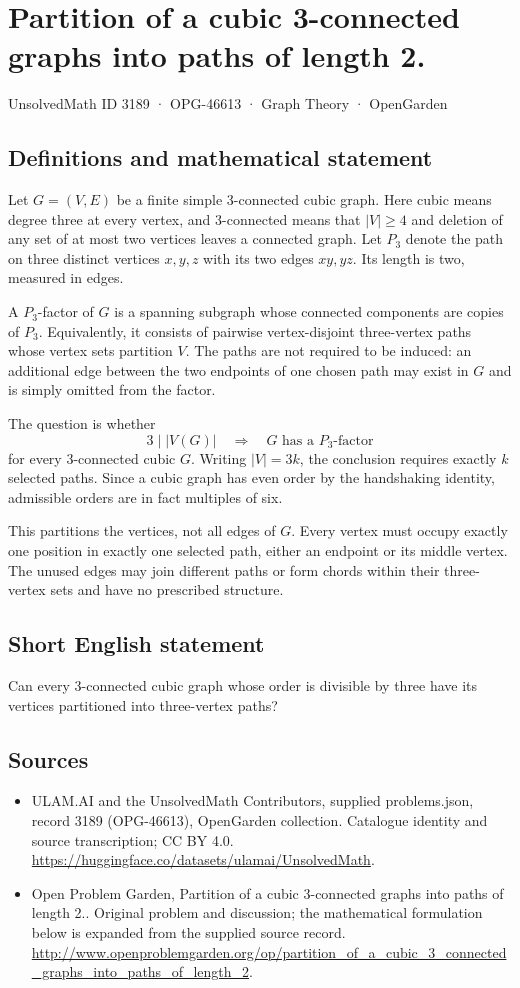 \documentclass[11pt,a4paper]{article}
\begin{document}
\section*{Partition of a cubic 3-connected graphs into paths of length 2.}\label{3189}
{\small UnsolvedMath ID 3189 · OPG-46613 · Graph Theory · OpenGarden}
\subsection{Definitions and mathematical statement}
Let $G=(V,E)$ be a finite simple $3$-connected cubic
graph. Here cubic means degree three at every vertex,
and $3$-connected means that $|V|\geq4$ and deletion
of any set of at most two vertices leaves a
connected graph. Let $P_3$ denote the path on three
distinct vertices $x,y,z$ with its two edges $xy,yz$.
Its length is two, measured in edges.

A $P_3$-factor of $G$ is a spanning subgraph whose
connected components are copies of $P_3$. Equivalently,
it consists of pairwise vertex-disjoint three-vertex
paths whose vertex sets partition $V$. The paths
are not required to be induced: an additional edge
between the two endpoints of one chosen path may
exist in $G$ and is simply omitted from the factor.

The question is whether
\[
 3\mid |V(G)|\quad\Longrightarrow\quad
 G\text{ has a }P_3\text{-factor}
\]
for every $3$-connected cubic $G$. Writing $|V|=3k$,
the conclusion requires exactly $k$ selected paths.
Since a cubic graph has even order by the
handshaking identity, admissible orders are in fact
multiples of six.

This partitions the vertices, not all edges of
$G$. Every vertex must occupy exactly one position
in exactly one selected path, either an endpoint
or its middle vertex. The unused edges may join
different paths or form chords within their
three-vertex sets and have no prescribed structure.
\subsection{Short English statement}
Can every 3-connected cubic graph whose order is divisible by three have its vertices partitioned into three-vertex paths?
\subsection{Sources}
\begin{itemize}
\item[S1] ULAM.AI and the UnsolvedMath Contributors, supplied problems.json, record 3189 (OPG-46613), OpenGarden collection. Catalogue identity and source transcription; CC BY 4.0.
\url{https://huggingface.co/datasets/ulamai/UnsolvedMath}.
\item[S2] Open Problem Garden, Partition of a cubic 3-connected graphs into paths of length 2.. Original problem and discussion; the mathematical formulation below is expanded from the supplied source record.
\url{http://www.openproblemgarden.org/op/partition_of_a_cubic_3_connected_graphs_into_paths_of_length_2}.
\end{itemize}
\end{document}
